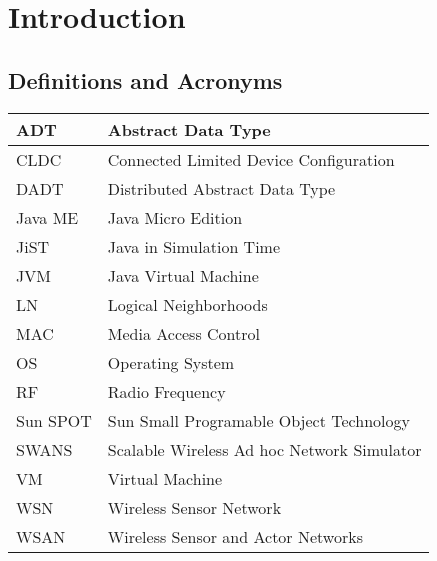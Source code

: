\chapter{Introduction}

\section{Definitions and Acronyms}

\begin{tabular}{| l |p{9cm}|}
\hline
ADT \T \B & Abstract Data Type \\
\hline
CLDC \T \B & Connected Limited Device Configuration \\
\hline
DADT \T \B & Distributed Abstract Data Type \\
\hline
Java ME \T \B & Java Micro Edition \\
\hline
JiST \T \B & Java in Simulation Time \\
\hline
JVM \T \B & Java Virtual Machine \\
\hline 
LN \T \B & Logical Neighborhoods \\
\hline
MAC \T \B & Media Access Control \\
\hline
OS \T \B & Operating System \\
\hline
RF \T \B & Radio Frequency \\
\hline
Sun SPOT \T \B & Sun Small Programable Object Technology \\
\hline
SWANS \T \B & Scalable Wireless Ad hoc Network Simulator \\
\hline
VM \T \B & Virtual Machine \\
\hline
WSN \T \B & Wireless Sensor Network \\
\hline
WSAN \T \B & Wireless Sensor and Actor Networks \\
\hline



\end{tabular}

